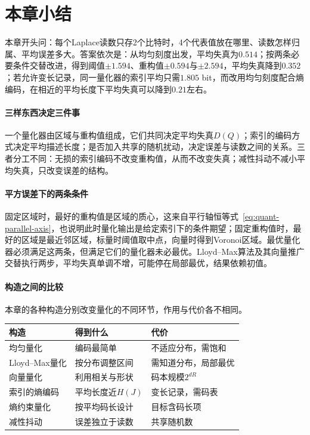 \section{本章小结}
\label{sec:quant-summary}

本章开头问：每个Laplace读数只存2个比特时，4个代表值放在哪里、读数怎样归属、平均误差多大。答案依次是：从均匀刻度出发，平均失真为$0.514$；按两条必要条件交替改进，得到阈值$\pm1.594$、重构值$\pm0.594$与$\pm2.594$，平均失真降到$0.352$；若允许变长记录，同一量化器的索引平均只需$1.805$ bit，而改用均匀刻度配合熵编码，在相近的平均长度下平均失真可以降到$0.21$左右。

\paragraph{三样东西决定三件事}
一个量化器由区域与重构值组成，它们共同决定平均失真$D(Q)$；索引的编码方式决定平均描述长度；是否加入共享的随机扰动，决定误差与读数之间的关系。三者分工不同：无损的索引编码不改变重构值，从而不改变失真；减性抖动不减小平均失真，只改变误差的结构。

\paragraph{平方误差下的两条条件}
固定区域时，最好的重构值是区域的质心，这来自平行轴恒等式~\eqref{eq:quant-parallel-axis}，也说明此时量化输出是给定索引下的条件期望；固定重构值时，最好的区域是最近邻区域，标量时阈值取中点，向量时得到Voronoi区域。最优量化器必须满足这两条，但满足它们的量化器未必最优。Lloyd--Max算法及其向量推广交替执行两步，平均失真单调不增，可能停在局部最优，结果依赖初值。

\paragraph{构造之间的比较}
本章的各种构造分别改变量化的不同环节，作用与代价各不相同。

\begin{BookInlineTable}
 \centering
 \begin{tabular}{lll}
  \toprule
  构造 & 得到什么 & 代价\\
  \midrule
  均匀量化 & 编码最简单 & 不适应分布，需饱和\\
  Lloyd--Max量化 & 按分布调整区间 & 需知道分布，局部最优\\
  向量量化 & 利用相关与形状 & 码本规模$2^{dR}$\\
  索引的熵编码 & 平均长度近$H(J)$ & 变长记录，需码表\\
  熵约束量化 & 按平均码长设计 & 目标含码长项\\
  减性抖动 & 误差独立于读数 & 共享随机数\\
  \bottomrule
 \end{tabular}
 \caption{本章各种构造的作用与代价。}
 \label{tab:quant-summary}
\end{BookInlineTable}

